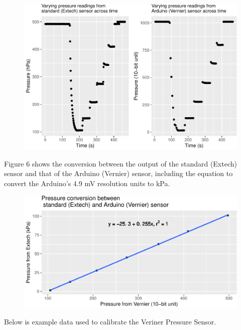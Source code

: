 \documentclass[12pt,]{article}
\begin{document}
\begin{figure}[h]

\includegraphics{paper_files/figure-latex/vernier_calibration-1} \hfill{}

\caption{\label{fig:figs}}\label{fig:vernier_calibration}
\end{figure}

Figure 6 shows the conversion between the output of the standard
(Extech) sensor and that of the Arduino (Vernier) sensor, including the
equation to convert the Arduino's 4.9 mV resolution units to kPa.

\begin{figure}[h]

{\centering \includegraphics{paper_files/figure-latex/vernier_cal2-1} 

}

\caption{\label{fig:figs}}\label{fig:vernier_cal2}
\end{figure}

Below is example data used to calibrate the Veriner Pressure Sensor.
\end{document}
